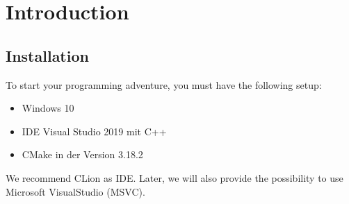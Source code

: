 \newpage
\chapter{Introduction}
\section{Installation}
To start your programming adventure, you must have the following setup:
\begin{itemize}
    \item Windows 10
    \item \gls{IDE} Visual Studio 2019 mit C++
    \item \gls{CMake} in der Version 3.18.2 
\end{itemize}
We recommend CLion as IDE. Later, we will also provide the possibility to use Microsoft VisualStudio (MSVC).
